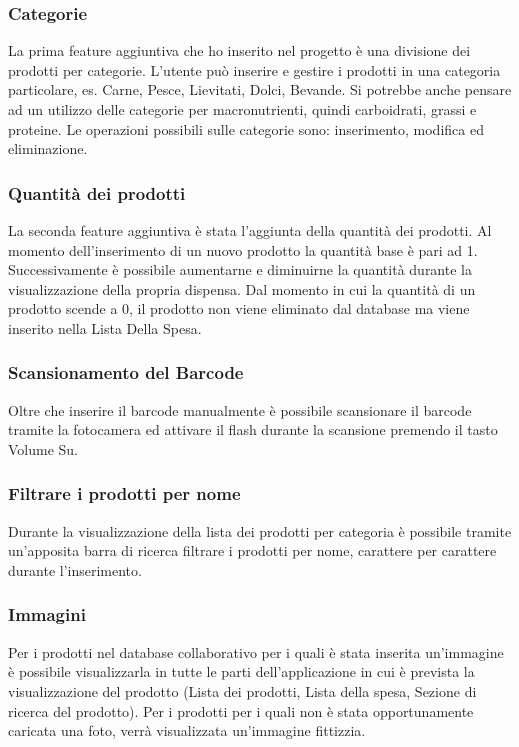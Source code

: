 \documentclass[12pt]{article}
\begin{document}
    \subsubsection{Categorie}
    La prima feature aggiuntiva che ho inserito nel progetto è una divisione dei prodotti per categorie. L'utente può inserire e gestire i
    prodotti in una categoria particolare, es. Carne, Pesce, Lievitati, Dolci, Bevande. Si potrebbe anche pensare ad un utilizzo delle categorie per 
    macronutrienti, quindi carboidrati, grassi e proteine. Le operazioni possibili sulle categorie sono: inserimento, modifica ed eliminazione.
    \subsubsection{Quantità dei prodotti}
    La seconda feature aggiuntiva è stata l'aggiunta della quantità dei prodotti. Al momento dell'inserimento di un nuovo prodotto la quantità
    base è pari ad 1. Successivamente è possibile aumentarne e diminuirne la quantità durante la visualizzazione della propria dispensa.
    Dal momento in cui la quantità di un prodotto scende a 0, il prodotto non viene eliminato dal database ma viene inserito nella Lista Della Spesa.
    \subsubsection{Scansionamento del Barcode}
    Oltre che inserire il barcode manualmente è possibile scansionare il barcode tramite la fotocamera ed attivare il flash durante la scansione
    premendo il tasto Volume Su.
    \subsubsection{Filtrare i prodotti per nome}
    Durante la visualizzazione della lista dei prodotti per categoria è possibile tramite un'apposita barra di ricerca filtrare i prodotti 
    per nome, carattere per carattere durante l'inserimento. 
    \subsubsection{Immagini}
    Per i prodotti nel database collaborativo per i quali è stata inserita un'immagine è possibile visualizzarla in tutte le parti dell'applicazione 
    in cui è prevista la visualizzazione del prodotto (Lista dei prodotti, Lista della spesa, Sezione di ricerca del prodotto). Per i prodotti
    per i quali non è stata opportunamente caricata una foto, verrà visualizzata un'immagine fittizzia.
\end{document}
